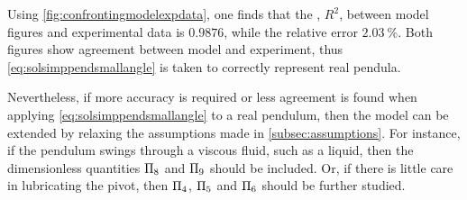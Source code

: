 Using \cref{fig:confrontingmodelexpdata}, one finds that the , $R^2$, between model figures and experimental data is $\num{0.9876}$, while the relative error $\SI{2.03}{\%}$. Both figures show agreement between model and experiment, thus \cref{eq:solsimppendsmallangle} is taken to correctly represent real pendula.

Nevertheless, if more accuracy is required or less agreement is found when applying \cref{eq:solsimppendsmallangle} to a real pendulum, then the model can be extended by relaxing the assumptions made in \cref{subsec:assumptions}. For instance, if the pendulum swings through a viscous fluid, such as a liquid, then the dimensionless quantities $\Pi_8$ and $\Pi_9$ should be included. Or, if there is little care in lubricating the pivot, then $\Pi_4$, $\Pi_5$ and $\Pi_6$ should be further studied.
